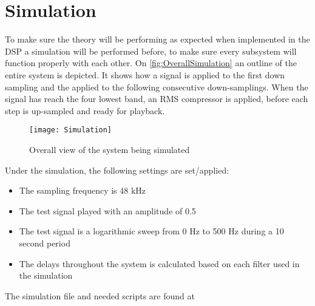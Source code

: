 \chapter{Simulation}
To make sure the theory will be performing as expected when implemented in the DSP a simulation will be performed before, to make sure every subsystem will function properly with each other. On \autoref{fig:OverallSimulation} an outline of the entire system is depicted. It shows how a signal is applied to the first down sampling and the applied to the following consecutive down-samplings. When the signal has reach the four lowest band, an RMS compressor is applied, before each step is up-sampled and ready for playback.

\begin{figure}[H]
\centering
\texttt{[image: Simulation]}
\label{fig:OverallSimulation}
\caption{Overall view of the system being simulated}
\end{figure}

Under the simulation, the following settings are set/applied:
\begin{itemize}
\item The sampling frequency is 48 kHz
\item The test signal played with an amplitude of 0.5
\item The test signal is a logarithmic sweep from 0 Hz to 500 Hz during a 10 second period
\item The delays throughout the system is calculated based on each filter used in the simulation
\end{itemize}

The simulation file and needed scripts are found at 


